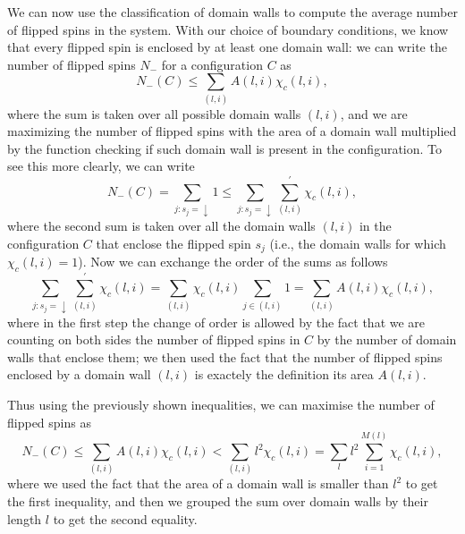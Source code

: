 We can now use the classification of domain walls to compute the average number of flipped spins in the system. With our choice of boundary conditions, we know that every flipped spin is enclosed by at least one domain wall: we can write the number of flipped spins \(N_-\) for a configuration \(C\) as
\[
  N_{-}(C) \leq \sum_{(l,i)} A(l,i) \chi_c(l,i),
\]
where the sum is taken over all possible domain walls \((l,i)\), and we are maximizing the number of flipped spins with the area of a domain wall multiplied by the function checking if such domain wall is present in the configuration. To see this more clearly, we can write
\[
  N_{-}(C) = \sum_{j:s_j=\downarrow} 1 \leq \sum_{j:s_j=\downarrow} \sum^{\prime}_{(l,i)} \chi_c(l,i),
\]
where the second sum is taken over all the domain walls \((l,i)\) in the configuration \(C\) that enclose the flipped spin \(s_j\) (i.e., the domain walls for which \(\chi_c(l,i) = 1\)). Now we can exchange the order of the sums as follows
\[
  \sum_{j:s_j=\downarrow} \sum^{\prime}_{(l,i)} \chi_c(l,i) = \sum_{(l,i)} \chi_c(l,i) \sum_{j \in (l,i)} 1 = \sum_{(l,i)} A(l,i) \chi_c(l,i),
\]
where in the first step the change of order is allowed by the fact that we are counting on both sides the number of flipped spins in \(C\) by the number of domain walls that enclose them; we then used the fact that the number of flipped spins enclosed by a domain wall \((l,i)\) is exactely the definition its area \(A(l,i)\).

Thus using the previously shown inequalities, we can maximise the number of flipped spins as
\[
  N_{-}(C) \leq \sum_{(l,i)} A(l,i) \chi_c(l,i) < \sum_{(l,i)} l^2 \chi_c(l,i) = \sum_{l} l^2 \sum_{i=1}^{M(l)} \chi_c(l,i),
\]
where we used the fact that the area of a domain wall is smaller than \(l^2\) to get the first inequality, and then we grouped the sum over domain walls by their length \(l\) to get the second equality.

